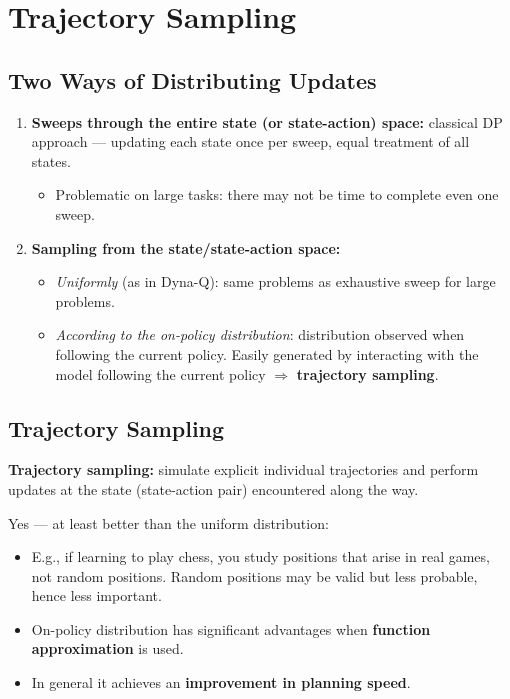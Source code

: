 \documentclass[11pt,a4paper]{article}
\theoremstyle{definition}
\theoremstyle{plain}
\theoremstyle{remark}
\begin{document}
\section{Trajectory Sampling}

\subsection{Two Ways of Distributing Updates}

\begin{enumerate}
    \item \textbf{Sweeps through the entire state (or state-action) space:} classical DP approach — updating each state once per sweep, equal treatment of all states.
        \begin{itemize}
            \item Problematic on large tasks: there may not be time to complete even one sweep.
        \end{itemize}
    \item \textbf{Sampling from the state/state-action space:}
        \begin{itemize}
            \item \textit{Uniformly} (as in Dyna-Q): same problems as exhaustive sweep for large problems.
            \item \textit{According to the on-policy distribution}: distribution observed when following the current policy. Easily generated by interacting with the model following the current policy $\Rightarrow$ \textbf{trajectory sampling}.
        \end{itemize}
\end{enumerate}

\subsection{Trajectory Sampling}

\textbf{Trajectory sampling:} simulate explicit individual trajectories and perform updates at the state (state-action pair) encountered along the way.

\begin{tcolorbox}[colback=green!5!white, colframe=green!60!black, title={Is the On-Policy Distribution a Good One?}]
Yes — at least better than the uniform distribution:
\begin{itemize}
    \item E.g., if learning to play chess, you study positions that arise in real games, not random positions. Random positions may be valid but less probable, hence less important.
    \item On-policy distribution has significant advantages when \textbf{function approximation} is used.
    \item In general it achieves an \textbf{improvement in planning speed}.
\end{itemize}
\end{tcolorbox}
\end{document}
